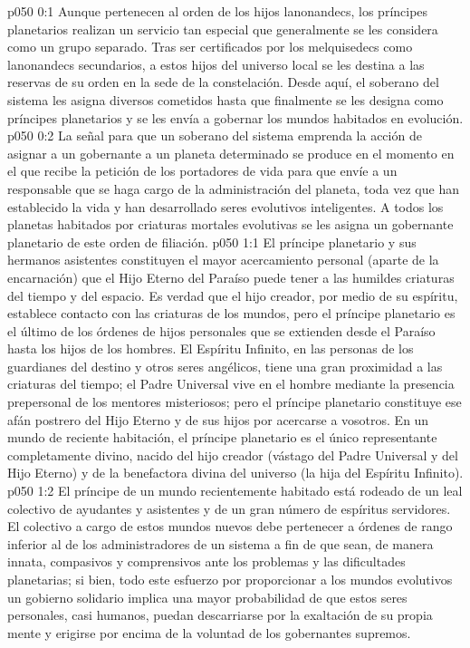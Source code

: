 \author{Lanonandec secundario}
\vs p050 0:1 Aunque pertenecen al orden de los hijos lanonandecs, los príncipes planetarios realizan un servicio tan especial que generalmente se les considera como un grupo separado. Tras ser certificados por los melquisedecs como lanonandecs secundarios, a estos hijos del universo local se les destina a las reservas de su orden en la sede de la constelación. Desde aquí, el soberano del sistema les asigna diversos cometidos hasta que finalmente se les designa como príncipes planetarios y se les envía a gobernar los mundos habitados en evolución.
\vs p050 0:2 La señal para que un soberano del sistema emprenda la acción de asignar a un gobernante a un planeta determinado se produce en el momento en el que recibe la petición de los portadores de vida para que envíe a un responsable que se haga cargo de la administración del planeta, toda vez que han establecido la vida y han desarrollado seres evolutivos inteligentes. A todos los planetas habitados por criaturas mortales evolutivas se les asigna un gobernante planetario de este orden de filiación.
\vs p050 1:1 El príncipe planetario y sus hermanos asistentes constituyen el mayor acercamiento personal (aparte de la encarnación) que el Hijo Eterno del Paraíso puede tener a las humildes criaturas del tiempo y del espacio. Es verdad que el hijo creador, por medio de su espíritu, establece contacto con las criaturas de los mundos, pero el príncipe planetario es el último de los órdenes de hijos personales que se extienden desde el Paraíso hasta los hijos de los hombres. El Espíritu Infinito, en las personas de los guardianes del destino y otros seres angélicos, tiene una gran proximidad a las criaturas del tiempo; el Padre Universal vive en el hombre mediante la presencia prepersonal de los mentores misteriosos; pero el príncipe planetario constituye ese afán postrero del Hijo Eterno y de sus hijos por acercarse a vosotros. En un mundo de reciente habitación, el príncipe planetario es el único representante completamente divino, nacido del hijo creador (vástago del Padre Universal y del Hijo Eterno) y de la benefactora divina del universo (la hija del Espíritu Infinito).
\vs p050 1:2 El príncipe de un mundo recientemente habitado está rodeado de un leal colectivo de ayudantes y asistentes y de un gran número de espíritus servidores. El colectivo a cargo de estos mundos nuevos debe pertenecer a órdenes de rango inferior al de los administradores de un sistema a fin de que sean, de manera innata, compasivos y comprensivos ante los problemas y las dificultades planetarias; si bien, todo este esfuerzo por proporcionar a los mundos evolutivos un gobierno solidario implica una mayor probabilidad de que estos seres personales, casi humanos, puedan descarriarse por la exaltación de su propia mente y erigirse por encima de la voluntad de los gobernantes supremos.
